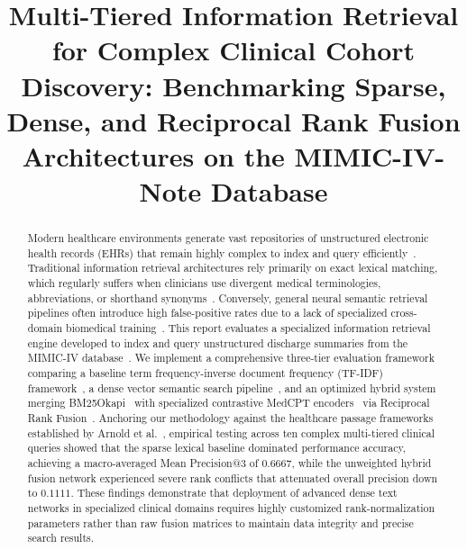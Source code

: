 \documentclass[conference]{IEEEtran}
\begin{document}
\title{Multi-Tiered Information Retrieval for Complex Clinical Cohort Discovery: Benchmarking Sparse, Dense, and Reciprocal Rank Fusion Architectures on the MIMIC-IV-Note Database}

\author{%
%
%
\and%
%
%
}

\maketitle

\begin{abstract}
Modern healthcare environments generate vast repositories of unstructured electronic health records (EHRs) that remain highly complex to index and query efficiently~\cite{johnson2023mimic}. Traditional information retrieval architectures rely primarily on exact lexical matching, which regularly suffers when clinicians use divergent medical terminologies, abbreviations, or shorthand synonyms~\cite{devlin2019bert}. Conversely, general neural semantic retrieval pipelines often introduce high false-positive rates due to a lack of specialized cross-domain biomedical training~\cite{alsentzer2019clinicalbert}. This report evaluates a specialized information retrieval engine developed to index and query unstructured discharge summaries from the MIMIC-IV database~\cite{johnson2023mimic}. We implement a comprehensive three-tier evaluation framework comparing a baseline term frequency-inverse document frequency (TF-IDF) framework~\cite{salton1988term}, a dense vector semantic search pipeline~\cite{reimers2019sentence}, and an optimized hybrid system merging BM25Okapi~\cite{robertson2009probabilistic} with specialized contrastive MedCPT encoders~\cite{jin2023medcpt} via Reciprocal Rank Fusion~\cite{cormack2009reciprocal}. Anchoring our methodology against the healthcare passage frameworks established by Arnold et al.~\cite{arnold2020learning}, empirical testing across ten complex multi-tiered clinical queries showed that the sparse lexical baseline dominated performance accuracy, achieving a macro-averaged Mean Precision@3 of $0.6667$, while the unweighted hybrid fusion network experienced severe rank conflicts that attenuated overall precision down to $0.1111$. These findings demonstrate that deployment of advanced dense text networks in specialized clinical domains requires highly customized rank-normalization parameters rather than raw fusion matrices to maintain data integrity and precise search results.
\end{abstract}
\end{document}
